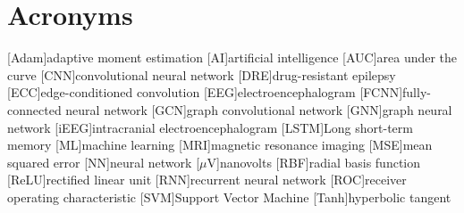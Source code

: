 
\chapter{Acronyms} \label{chap: Acronyms}

\begin{acronym}[AAAAA]
    [Adam]{adaptive moment estimation}
    [AI]{artificial intelligence}
    [AUC]{area under the curve}
    [CNN]{convolutional neural network}
    [DRE]{drug-resistant epilepsy}
    [ECC]{edge-conditioned convolution}
    [EEG]{electroencephalogram}
    [FCNN]{fully-connected neural network}
    [GCN]{graph convolutional network}
    [GNN]{graph neural network}
    [iEEG]{intracranial electroencephalogram}
    [LSTM]{Long short-term memory}
    [ML]{machine learning}
    [MRI]{magnetic resonance imaging}
    [MSE]{mean squared error}
    [NN]{neural network}
    [$\mu$V]{nanovolts}
    [RBF]{radial basis function}
    [ReLU]{rectified linear unit}
    [RNN]{recurrent neural network}
    [ROC]{receiver operating characteristic}
    [SVM]{Support Vector Machine}
    [Tanh]{hyperbolic tangent}
\end{acronym}
